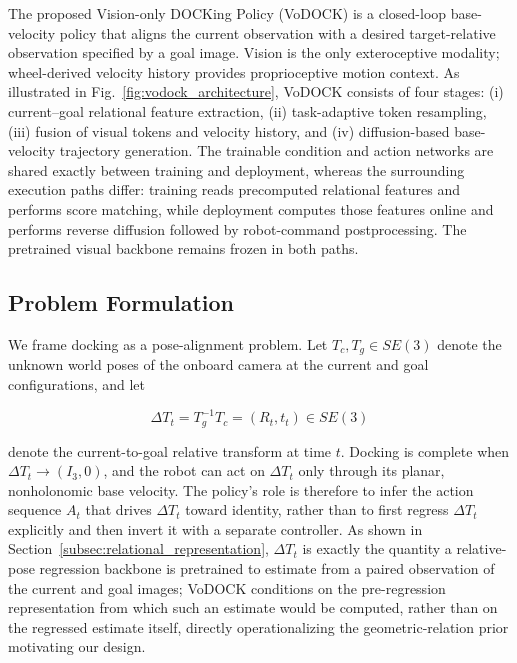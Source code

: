 \documentclass[letterpaper, 10 pt, conference]{IEEEtran}  %
\begin{document}
The proposed Vision-only DOCKing Policy (VoDOCK) is a closed-loop base-velocity policy that aligns the current observation with a desired target-relative observation specified by a goal image. Vision is the only exteroceptive modality; wheel-derived velocity history provides proprioceptive motion context. As illustrated in Fig.~\ref{fig:vodock_architecture}, VoDOCK consists of four stages: (i) current--goal relational feature extraction, (ii) task-adaptive token resampling, (iii) fusion of visual tokens and velocity history, and (iv) diffusion-based base-velocity trajectory generation. The trainable condition and action networks are shared exactly between training and deployment, whereas the surrounding execution paths differ: training reads precomputed relational features and performs score matching, while deployment computes those features online and performs reverse diffusion followed by robot-command postprocessing. The pretrained visual backbone remains frozen in both paths.

\subsection{Problem Formulation}
\label{subsec:problem_formulation}

We frame docking as a pose-alignment problem. Let $T_c,T_g\in SE(3)$ denote the unknown world poses of the onboard camera at the current and goal configurations, and let

\begin{equation}
\Delta T_t = T_g^{-1}T_c = (R_t,t_t)\in SE(3)
\end{equation}

denote the current-to-goal relative transform at time $t$. Docking is complete when $\Delta T_t\to(I_3,0)$, and the robot can act on $\Delta T_t$ only through its planar, nonholonomic base velocity. The policy's role is therefore to infer the action sequence $A_t$ that drives $\Delta T_t$ toward identity, rather than to first regress $\Delta T_t$ explicitly and then invert it with a separate controller. As shown in Section~\ref{subsec:relational_representation}, $\Delta T_t$ is exactly the quantity a relative-pose regression backbone is pretrained to estimate from a paired observation of the current and goal images; VoDOCK conditions on the pre-regression representation from which such an estimate would be computed, rather than on the regressed estimate itself, directly operationalizing the geometric-relation prior motivating our design.
\end{document}
